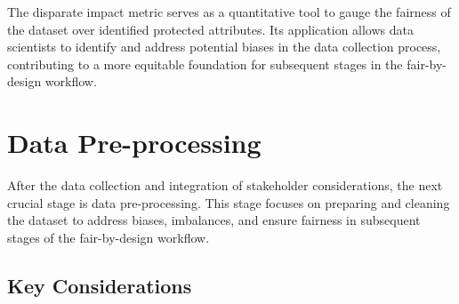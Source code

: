 \documentclass[12pt,a4paper,openright,twoside]{book}
\begin{document}
The disparate impact metric serves as a quantitative tool to gauge the fairness of the dataset over identified protected attributes. Its application allows data scientists to identify and address potential biases in the data collection process, contributing to a more equitable foundation for subsequent stages in the fair-by-design workflow.

\section{Data Pre-processing}
\label{section:pre-proc}

After the data collection and integration of stakeholder considerations, the next crucial stage is data pre-processing. This stage focuses on preparing and cleaning the dataset to address biases, imbalances, and ensure fairness in subsequent stages of the fair-by-design workflow.

\subsection{Key Considerations}
\end{document}
